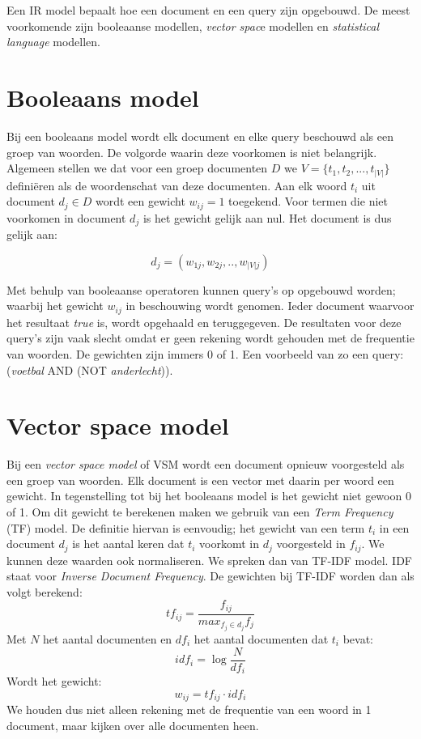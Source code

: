 Een IR model bepaalt hoe een document en een query zijn opgebouwd. De meest voorkomende zijn booleaanse modellen, \emph{vector spac}e modellen en \emph{statistical language} modellen.
\section{Booleaans model}
Bij een booleaans model wordt elk document en elke query beschouwd als een groep van woorden. De volgorde waarin deze voorkomen is niet belangrijk.
Algemeen stellen we dat voor een groep documenten $D$ we $V = \{ t_1, t_2, ..., t_{|V|}\}$ defini\"eren als de woordenschat van deze documenten. 
Aan elk woord $t_i$ uit document $d_j \in D$ wordt een gewicht $w_{ij} = 1$ toegekend. Voor termen die niet voorkomen in document $d_j$ is het gewicht gelijk aan nul. Het document is dus gelijk aan: 

\begin{equation}
d_j = \left( w_{1j},w_{2j},..,w_{|V|j} \right)
\end{equation}

Met behulp van booleaanse operatoren kunnen query's op opgebouwd worden; waarbij het gewicht $w_{ij}$ in beschouwing wordt genomen. Ieder document waarvoor het resultaat \emph{true} is, wordt opgehaald en teruggegeven. De resultaten voor deze query's zijn vaak slecht omdat er geen rekening wordt gehouden met de frequentie van woorden. De gewichten zijn immers 0 of 1. Een voorbeeld van zo een query: (\emph{voetbal} AND (NOT \emph{anderlecht})).

\section{Vector space model}
Bij een \emph{vector space model} of VSM wordt een document opnieuw voorgesteld als een groep van woorden. Elk document is een vector met daarin per woord een gewicht. In tegenstelling tot bij het booleaans model is het gewicht niet gewoon 0 of 1. Om dit gewicht te berekenen maken we gebruik van een \emph{Term Frequency} (TF) model. De definitie  hiervan is eenvoudig; het gewicht van een term $t_i$ in een document $d_j$ is het aantal keren dat $t_i$ voorkomt in $d_j$ voorgesteld in $f_{ij}$. We kunnen deze waarden ook normaliseren. We spreken dan van TF-IDF model. IDF staat voor \emph{Inverse Document Frequency}. De gewichten bij TF-IDF worden dan als volgt berekend:
\begin{equation}
tf_{ij} = \frac{f_{ij}}{max_{f_j \in d_j}f_j}
\end{equation}
Met $N$ het aantal documenten en $df_i$ het aantal documenten dat $t_i$ bevat:
\begin{equation}
idf_i = \log{ \frac{N}{df_i}}
\end{equation}
Wordt het gewicht:
\begin{equation}
w_{ij} = tf_{ij} \cdot idf_i
\end{equation}
We houden dus niet alleen rekening met de frequentie van een woord in 1 document, maar kijken over alle documenten heen.

